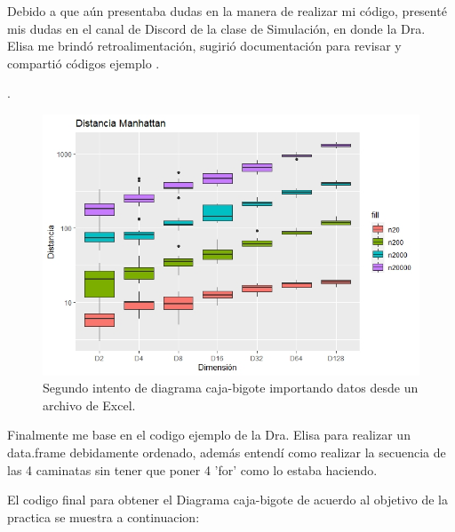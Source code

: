 \documentclass{article}
\begin{document}
Debido a que aún presentaba dudas en la manera de realizar mi código, presenté mis dudas en el canal de Discord de la clase de Simulación, en donde la Dra. Elisa me brindó retroalimentación, sugirió documentación para revisar \citep{11} y compartió códigos ejemplo \citep{12}.

\newpage
.
\bigskip
\bigskip

\begin{figure}[h!]%
    \centering
    \includegraphics[width=170mm]{Figura3.jpeg} %
    \caption{Segundo intento de diagrama caja-bigote importando datos desde un archivo de Excel.}
    \label{Figura3}
\end{figure}

Finalmente me base en el codigo ejemplo de la Dra. Elisa para realizar un data.frame debidamente ordenado, además entendí como realizar la secuencia de las 4 caminatas sin tener que poner 4 'for' como lo estaba haciendo. 

El codigo final para obtener el Diagrama caja-bigote de acuerdo al objetivo de la practica se muestra a continuacion:
\end{document}
